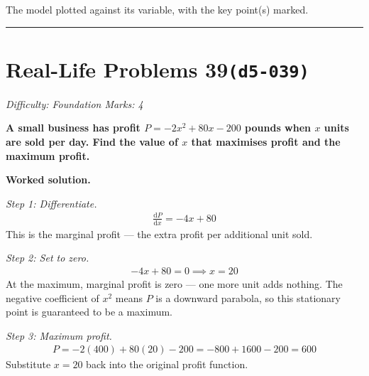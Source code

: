 \documentclass[11pt]{article}
\newcommand{\question}[1]{\par\medskip\noindent\textbf{#1}\par}
\begin{document}
\begin{center}
{
}
\end{center}
\small The model plotted against its variable, with the key point(s) marked.\normalsize

\medskip\hrule

\section*{Real-Life Problems 39\quad\small\texttt{(d5-039)}}
\textit{Difficulty: Foundation \quad\textbar\quad Marks: 4}

\question{A small business has profit \( P = -2x^2 + 80x - 200 \) pounds when \( x \) units are sold per day. Find the value of \( x \) that maximises profit and the maximum profit.}

\textbf{Worked solution.}

\textit{Step 1: Differentiate.}
\[\begin{gathered}
\frac{\mathrm{d}P}{\mathrm{d}x} = -4x + 80
\end{gathered}\]
This is the marginal profit --- the extra profit per additional unit sold.

\textit{Step 2: Set to zero.}
\[\begin{gathered}
-4x + 80 = 0 \implies x = 20
\end{gathered}\]
At the maximum, marginal profit is zero --- one more unit adds nothing. The negative coefficient of \( x^2 \) means \( P \) is a downward parabola, so this stationary point is guaranteed to be a maximum.

\textit{Step 3: Maximum profit.}
\[\begin{gathered}
P = -2(400) + 80(20) - 200 = -800 + 1600 - 200 = 600
\end{gathered}\]
Substitute \( x = 20 \) back into the original profit function.
\end{document}
